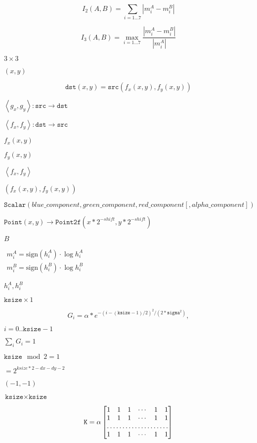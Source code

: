 \documentclass{article}
\begin{document}
\[I_2(A,B) = \sum _{i=1...7} \left | m^A_i - m^B_i \right |\]
\pagebreak

\[I_3(A,B) = \max _{i=1...7} \frac{ \left| m^A_i - m^B_i \right| }{ \left| m^A_i \right| }\]
\pagebreak

$3 \times 3$
\pagebreak

$(x, y)$
\pagebreak

\[\texttt{dst} (x,y)= \texttt{src} (f_x(x,y), f_y(x,y))\]
\pagebreak

$\left<g_x, g_y\right>: \texttt{src} \rightarrow \texttt{dst}$
\pagebreak

$\left<f_x, f_y\right>: \texttt{dst} \rightarrow \texttt{src}$
\pagebreak

$f_x(x,y)$
\pagebreak

$f_y(x,y)$
\pagebreak

$\left<f_x, f_y\right>$
\pagebreak

$(f_x(x,y), f_y(x,y))$
\pagebreak

\[\texttt{Scalar} (blue \_ component, green \_ component, red \_ component[, alpha \_ component])\]
\pagebreak

$\texttt{Point}(x,y)\rightarrow\texttt{Point2f}(x*2^{-shift},y*2^{-shift})$
\pagebreak

$B$
\pagebreak

$\begin{array}{l} m^A_i = \mathrm{sign} (h^A_i) \cdot \log{h^A_i} \\ m^B_i = \mathrm{sign} (h^B_i) \cdot \log{h^B_i} \end{array}$
\pagebreak

$h^A_i, h^B_i$
\pagebreak

$\texttt{ksize} \times 1$
\pagebreak

\[G_i= \alpha *e^{-(i-( \texttt{ksize} -1)/2)^2/(2* \texttt{sigma}^2)},\]
\pagebreak

$i=0..\texttt{ksize}-1$
\pagebreak

$\sum_i G_i=1$
\pagebreak

$\texttt{ksize} \mod 2 = 1$
\pagebreak

$=2^{ksize*2-dx-dy-2}$
\pagebreak

$(-1, -1)$
\pagebreak

$\texttt{ksize} \times \texttt{ksize}$
\pagebreak

\[\texttt{K} = \alpha \begin{bmatrix} 1 & 1 & 1 & \cdots & 1 & 1 \\ 1 & 1 & 1 & \cdots & 1 & 1 \\ \hdotsfor{6} \\ 1 & 1 & 1 & \cdots & 1 & 1 \end{bmatrix}\]
\pagebreak
\end{document}

